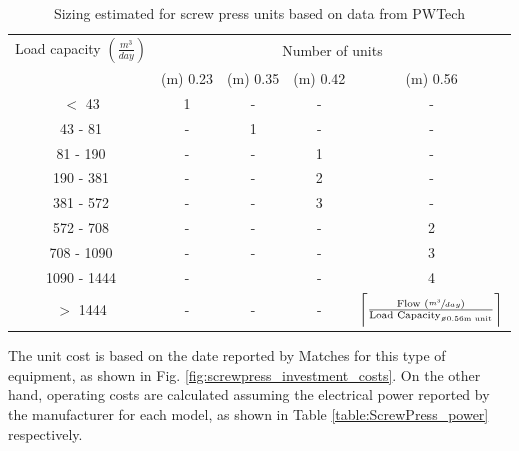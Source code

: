 \documentclass[10pt,a4paper]{article}
\DeclarePairedDelimiter{\ceil}{\lceil}{\rceil}
\begin{document}
\begin{table}[H] 
	\begin{adjustwidth}{}{}
		\centering
		\caption{Sizing estimated for screw press units based on data from PWTech \cite{PWTech}} \label{table:ScrewPress_units}
		\begin{tabular}{c c c c c}
			\toprule
			\multicolumn{1}{c}{Load capacity $\left(\frac{m^{3}}{day}\right)$}&\multicolumn{4}{c}{Number of units}\\
			\cmidrule(lr){2-5}
			&\diameter(m) 0.23 & \diameter(m) 0.35 & \diameter(m) 0.42 & \diameter(m) 0.56	\\ \midrule
			$<$ 43 		& \cellcolor{blue!25}1 	& - 					& - & -	\\
			43 - 81 	& -						& \cellcolor{blue!25}1 	& - & - 	\\
			81 - 190 	& -						& - 					& \cellcolor{blue!25}1 & - 	\\
			190 - 381 	& -						& -					 	& \cellcolor{blue!25}2 & -	\\ 
			381 - 572 & -						& -					 	& \cellcolor{blue!25}3 & - 	\\ 
			572 - 708 & -						& -					 	& - & \cellcolor{blue!25}2	 	\\ 
			708 - 1090 & -						& -					 	& - & \cellcolor{blue!25}3	 	\\
			1090 - 1444 & -						& \-				 	& - & \cellcolor{blue!25}4	 	\\
			$>$ 1444 	&-						& -					 	& - & \cellcolor{blue!25}$\ceil[\bigg]{\frac{\text{Flow } \left(\sfrac{m^{3}}{day}\right)}{\text{Load Capacity}_{\text{\diameter 0.56m unit}}}}$  	\\
		\end{tabular}
	\end{adjustwidth}
\end{table}

The unit cost is based on the date reported by Matches \cite{Matches} for this type of equipment, as shown in Fig. \ref{fig:screwpress_investment_costs}. On the other hand, operating costs are calculated assuming the electrical power reported by the manufacturer for each model, as shown in Table \ref{table:ScrewPress_power} respectively.

\end{document}

